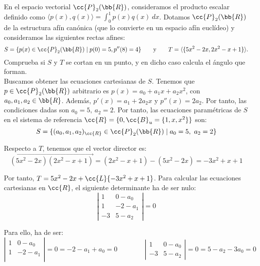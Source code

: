 \begin{ejercicio}
    En el espacio vectorial $\cc{P}_2(\bb{R})$, consideramos el producto escalar definido como $\langle p(x), q(x)\rangle = \int_0^1 p(x)q(x)~dx$.
    Dotamos $\cc{P}_2(\bb{R})$ de la estructura afín canónica (que lo convierte en un espacio afín euclídeo) y consideramos las siguientes rectas afines:
    \begin{equation*}
        S = \{p(x) \in \cc{P}_2(\bb{R}) \mid p(0) = 5, p''(8) = 4\}
        \qquad \text{y} \qquad
        T = \langle\{5x^2 - 2x, 2x^2 - x + 1\}\rangle.
    \end{equation*} 
    Comprueba si $S$ y $T$ se cortan en un punto, y en dicho caso calcula el ángulo que forman.\\

    Buscamos obtener las ecuaciones cartesianas de $S$. Tenemos que $p\in \cc{P}_2(\bb{R})$ arbitrario es $p(x)=a_0+a_1x+a_2x^2$, con $a_0,a_1,a_2\in \bb{R}$. Además, $p'(x)=a_1+2a_2x$ y $p''(x)=2a_2$. Por tanto, las condiciones dadas son $a_0=5,~ a_2=2$. Por tanto, las ecuaciones paramétricas de $S$ en el sistema de referencia $\cc{R}=\{0,\cc{B}_u=\{1,x,x^2\}\}$ son:
    \begin{equation*}
        S = \{(a_0,a_1,a_2)_{\cc{R}}\in \cc{P}_2(\bb{R})\mid a_0=5,~a_2=2\}
    \end{equation*}

    Respecto a $T$, tenemos que el vector director es:
    $$\vec{(5x^2-2x)(2x^2-x+1)} = (2x^2-x+1) - (5x^2-2x) = -3x^2+x+1$$

    Por tanto, $T=5x^2-2x + \cc{L}\{-3x^2+x+1\}$. Para calcular las ecuaciones cartesianas en $\cc{R}$, el siguiente determinante ha de ser nulo:
    \begin{equation*}
        \left|
            \begin{array}{cc}
                1 & 0-a_0 \\
                1 & -2-a_1\\
                -3 & 5-a_2
            \end{array}
        \right| = 0
    \end{equation*}

    Para ello, ha de ser:
    \begin{equation*}
        \left|
            \begin{array}{cc}
                1 & 0-a_0 \\
                1 & -2-a_1\\
            \end{array}
        \right| = 0 = -2-a_1 + a_0 = 0
        \qquad \qquad
        \left|
            \begin{array}{cc}
                1 & 0-a_0 \\
                -3 & 5-a_2
            \end{array}
        \right| = 0 = 5-a_2-3a_0 = 0
    \end{equation*}


\end{ejercicio}
